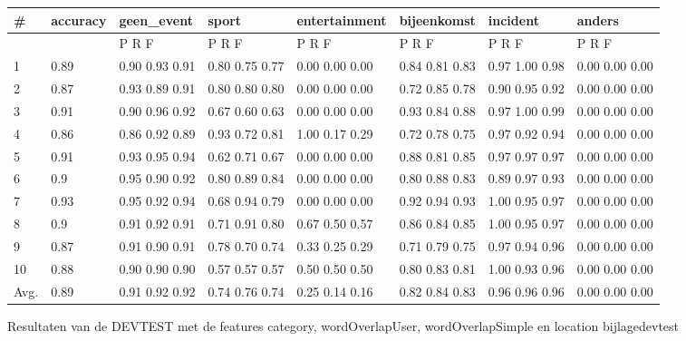 {{%
{\begin{tabular}{llllllll}
\hline
 \#    & accuracy   & geen\_event     & sport          & entertainment   & bijeenkomst    & incident       & anders         \\
\hline
      &            & P    R    F    & P    R    F    & P    R    F     & P    R    F    & P    R    F    & P    R    F    \\
 1    & 0.89       & 0.90 0.93 0.91 & 0.80 0.75 0.77 & 0.00 0.00 0.00  & 0.84 0.81 0.83 & 0.97 1.00 0.98 & 0.00 0.00 0.00 \\
 2    & 0.87       & 0.93 0.89 0.91 & 0.80 0.80 0.80 & 0.00 0.00 0.00  & 0.72 0.85 0.78 & 0.90 0.95 0.92 & 0.00 0.00 0.00 \\
 3    & 0.91       & 0.90 0.96 0.92 & 0.67 0.60 0.63 & 0.00 0.00 0.00  & 0.93 0.84 0.88 & 0.97 1.00 0.99 & 0.00 0.00 0.00 \\
 4    & 0.86       & 0.86 0.92 0.89 & 0.93 0.72 0.81 & 1.00 0.17 0.29  & 0.72 0.78 0.75 & 0.97 0.92 0.94 & 0.00 0.00 0.00 \\
 5    & 0.91       & 0.93 0.95 0.94 & 0.62 0.71 0.67 & 0.00 0.00 0.00  & 0.88 0.81 0.85 & 0.97 0.97 0.97 & 0.00 0.00 0.00 \\
 6    & 0.9        & 0.95 0.90 0.92 & 0.80 0.89 0.84 & 0.00 0.00 0.00  & 0.80 0.88 0.83 & 0.89 0.97 0.93 & 0.00 0.00 0.00 \\
 7    & 0.93       & 0.95 0.92 0.94 & 0.68 0.94 0.79 & 0.00 0.00 0.00  & 0.92 0.94 0.93 & 1.00 0.95 0.97 & 0.00 0.00 0.00 \\
 8    & 0.9        & 0.91 0.92 0.91 & 0.71 0.91 0.80 & 0.67 0.50 0.57  & 0.86 0.84 0.85 & 1.00 0.95 0.97 & 0.00 0.00 0.00 \\
 9    & 0.87       & 0.91 0.90 0.91 & 0.78 0.70 0.74 & 0.33 0.25 0.29  & 0.71 0.79 0.75 & 0.97 0.94 0.96 & 0.00 0.00 0.00 \\
 10   & 0.88       & 0.90 0.90 0.90 & 0.57 0.57 0.57 & 0.50 0.50 0.50  & 0.80 0.83 0.81 & 1.00 0.93 0.96 & 0.00 0.00 0.00 \\
 Avg. & 0.89       & 0.91 0.92 0.92 & 0.74 0.76 0.74 & 0.25 0.14 0.16  & 0.82 0.84 0.83 & 0.96 0.96 0.96 & 0.00 0.00 0.00 \\
\hline
\end{tabular}
}%
{Resultaten van de DEVTEST met de features category, wordOverlapUser, wordOverlapSimple en location}%
{bijlagedevtest}
\hfill %
%
{\begin{tabular}{llllllll}

\end{tabular}}}}
